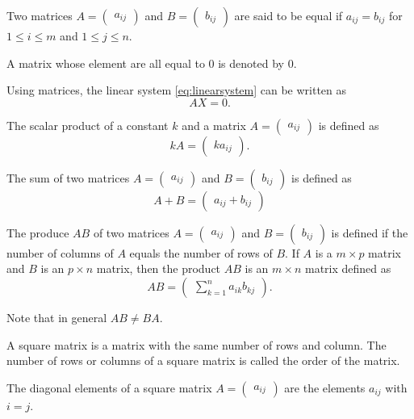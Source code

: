 Two matrices $A=\begin{pmatrix}
  a_{ij}
\end{pmatrix}$ and $B=\begin{pmatrix}
  b_{ij}
\end{pmatrix}$ are said to be equal if $a_{ij}=b_{ij}$ for $1\le i\le m$ and $1\le j\le n$.

A matrix whose element are all equal to $0$ is denoted by $0$.

Using matrices, the linear system \eqref{eq:linearsystem} can be written as
\[AX=0.\]

The scalar product of a constant $k$ and a matrix $A=\begin{pmatrix}
  a_{ij}
\end{pmatrix}$ is defined as
\[kA=\begin{pmatrix}
  ka_{ij}
\end{pmatrix}.\]

The sum of two matrices $A=\begin{pmatrix}
  a_{ij}
\end{pmatrix}$ and $B=\begin{pmatrix}
  b_{ij}
\end{pmatrix}$ is defined as
\[A+B=\begin{pmatrix}
  a_{ij}+b_{ij}
\end{pmatrix}\]

The produce $AB$ of two matrices $A=\begin{pmatrix}
  a_{ij}
\end{pmatrix}$ and $B=\begin{pmatrix}
  b_{ij}
\end{pmatrix}$ is defined if the number of columns of $A$ equals the number of rows of $B$. If $A$ is a $m\times p$ matrix and $B$ is an $p\times n$ matrix, then the product $AB$ is an $m\times n$ matrix defined as
\[AB=\begin{pmatrix}
  \sum\limits_{k=1}^na_{ik}b_{kj}
\end{pmatrix}.\]

Note that in general $AB\neq BA$.

A square matrix is a matrix with the same number of rows and column. The number of rows or columns of a square matrix is called the order of the matrix.

The diagonal elements of a square matrix $A=\begin{pmatrix}
  a_{ij}
\end{pmatrix}$ are the elements $a_{ij}$ with $i=j$.

